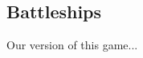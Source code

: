 \documentclass[a4paper]{easychair}
\begin{document}
\subsection{Battleships}
\label{sect:battleships-intro}
Our version of this game...

%
\label{sect:bib}

%
%
%
%


\end{document}
